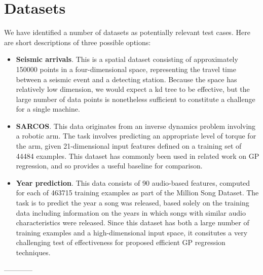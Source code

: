 \documentclass{article}
\begin{document}
\section{Datasets}
We have identified a number of datasets as potentially relevant test cases. Here are short descriptions of three possible options:
\begin{itemize}
\item {\bf Seismic arrivals}. This is a spatial dataset consisting of approximately 150000 points in a four-dimensional space, representing the travel time between a seismic event and a detecting station. Because the space has relatively low dimension, we would expect a kd tree to be effective, but the large number of data points is nonetheless sufficient to constitute a challenge for a single machine.
\item {\bf SARCOS}. This data originates from an inverse dynamics problem involving a robotic arm. The task involves predicting an appropriate level of torque for the arm, given 21-dimensional input features defined on a training set of 44484 examples. This dataset has commonly been used in related work on GP regression, and so provides a useful baseline for comparison. 
\item {\bf Year prediction}. This data consists of 90 audio-based features, computed for each of 463715 training examples as part of the Million Song Dataset. The task is to predict the year a song was released, based solely on the training data including information on the years in which songs with similar audio characteristics were released. Since this dataset has both a large number of training examples and a high-dimensional input space, it consitutes a very challenging test of effectiveness for proposed efficient GP regression techniques.   
\end{itemize}------------
\newpage


\end{document}
